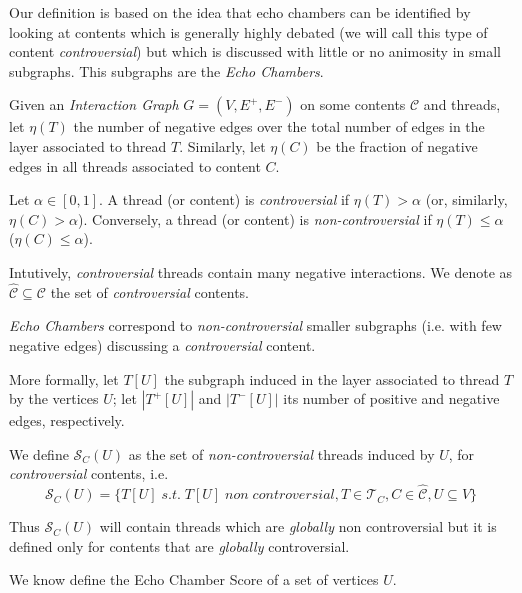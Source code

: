 Our definition is based on the idea that echo chambers can be identified by
looking at contents which is generally highly debated (we will call
this type of content \emph{controversial}) but which is discussed with little
or no animosity in small subgraphs. This subgraphs are the \emph{Echo
	Chambers}.

\bigskip

Given an \emph{Interaction Graph} $G = (V, E^{+}, E^{-})$ on some contents
$\mathcal{C} $ and threads, let $\eta(T)$ the number of negative edges over the
total number of edges in the layer associated to thread $T$. Similarly,
let $\eta(C)$ be the fraction of negative edges in all threads associated to
content $C$.

\begin{definition}
	Let $\alpha \in [0,1]$. A thread (or content) is \emph{controversial} if
	$\eta(T) > \alpha$ (or, similarly, $\eta(C) > \alpha $). Conversely, a
	thread (or content) is \emph{non-controversial} if $\eta(T) \leq \alpha$
	($\eta(C) \leq \alpha$).
\end{definition}

Intutively, \emph{controversial} threads contain many negative
interactions. We denote as $\hat{\mathcal{C} } \subseteq \mathcal{C} $ the
set of \emph{controversial} contents.

\medskip

\emph{Echo Chambers} correspond to \emph{non-controversial} smaller subgraphs
(i.e. with few negative edges) discussing a
\emph{controversial} content.

More formally, let $T[U]$ the subgraph induced in the layer associated to
thread $T$ by the vertices $U$; let $|T^{+} [U]|$ and $|T^{-} [U]|$ its number
of positive and negative edges, respectively.

We define $\mathcal{S}_C (U)$ as the set of \emph{non-controversial} threads
induced by $U$, for \textit{controversial} contents, i.e.
	{\small
		\begin{equation}
			\mathcal{S} _{C} (U) = \{ T[U] \; s.t. \; T[U] \; non \;
			controversial, T \in \mathcal{T} _{C}, C
			\in \hat{\mathcal{C}}, U \subseteq V\}
		\end{equation}
	}

Thus $\mathcal{S} _C (U)$ will contain threads which are \emph{globally} non
controversial but it is defined only for contents that are \emph{globally}
controversial.

\medskip

We know define the Echo Chamber Score of a set of vertices $U$.

